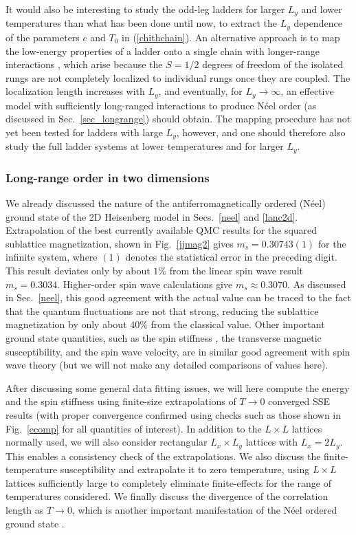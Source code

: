 \documentclass[draft,numberedheadings]{aipproc}
\begin{document}
It would also be interesting to study the odd-leg ladders for larger $L_y$ and lower temperatures than what has been done until now, to extract the $L_y$ dependence
of the parameters $c$ and $T_0$ in (\ref{chithchain}). An alternative approach is to map the low-energy properties of a ladder onto a single chain with longer-range 
interactions \cite{frischmuth97}, which arise because the $S=1/2$ degrees of freedom of the isolated rungs are not completely localized to individual rungs once they are
coupled. The localization length increases with $L_y$, and eventually, for $L_y \to \infty$, an effective model with sufficiently long-ranged interactions 
to produce N\'eel order (as discussed in Sec.~\ref{sec_longrange}) should obtain. The mapping procedure has not yet been tested for ladders with large $L_y$, however, 
and one should therefore also study the full ladder systems at lower temperatures and for larger $L_y$.

\subsubsection{Long-range order in two dimensions}
\label{sec_2dheis}

We already discussed the nature of the antiferromagnetically ordered (N\'eel) ground state of the 2D Heisenberg model in Secs.~\ref{neel} and \ref{lanc2d}. 
Extrapolation of the best currently available QMC results \cite{awshg} for the squared sublattice magnetization, shown in Fig.~\ref{jjmag2} gives $m_s=0.30743(1)$ 
for the infinite system, where $(1)$ denotes the statistical error in the preceding digit. This result deviates only by about $1\%$ from the linear spin wave result 
$m_s=0.3034$. Higher-order spin wave calculations \cite{canali,hamer,igarashi} give $m_s\approx 0.3070$. As discussed in Sec.~\ref{neel}, this good agreement with the 
actual value can be traced to the fact that the quantum fluctuations are not that strong, reducing the sublattice magnetization by only about $40\%$ from the classical 
value. Other important ground state quantities, such as the spin stiffness \cite{hamer94}, the transverse magnetic susceptibility, and the spin wave velocity, are in 
similar good agreement with spin wave theory (but we will not make any detailed comparisons of values here). 

After discussing some general data fitting issues, we will here compute the energy and the spin stiffness using finite-size extrapolations of $T\to 0$ converged
SSE results (with proper convergence confirmed using checks such as those shown in Fig.~\ref{ecomp} for all quantities of interest). In addition to the $L\times L$ 
lattices normally used, we will also consider rectangular $L_x\times L_y$ lattices with $L_x=2L_y$. This enables a consistency check of the extrapolations. We also 
discuss the finite-temperature susceptibility and extrapolate it to zero temperature, using $L\times L$ lattices sufficiently large to completely eliminate 
finite-effects for the range of temperatures considered. We finally discuss the divergence of the correlation length as $T\to 0$, which is another important 
manifestation of the  N\'eel ordered ground state \cite{chn}. 
\end{document}
